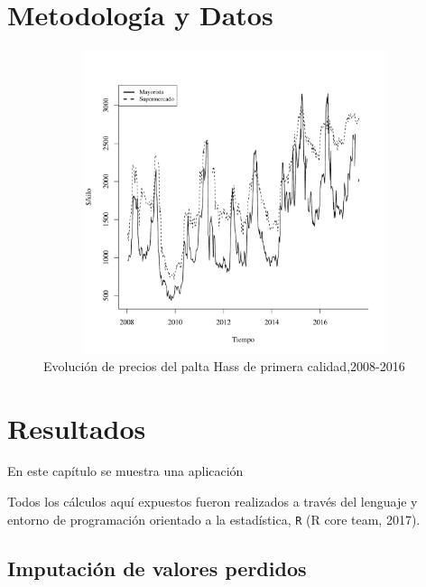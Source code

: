 \documentclass[12pt, twoside]{book}\usepackage[]{graphicx}\usepackage[]{color}
\newenvironment{knitrout}{}{} %
\numberwithin{equation}{section}
\numberwithin{theorem}{section}
\numberwithin{teorema}{section}
\numberwithin{defi}{section}
\numberwithin{prop}{section}
\numberwithin{defi}{section}
\theoremstyle{plain}
\begin{document}
\chapter{Metodología y Datos}






\begin{knitrout}
\color{fgcolor}\begin{figure}[H]

{\centering \includegraphics[width=6.5in,height=3.5in]{figure/fig-1-1} 

}

\caption[Evolución de precios del palta Hass de primera calidad,2008-2016]{Evolución de precios del palta Hass de primera calidad,2008-2016}\label{fig:fig-1}
\end{figure}


\end{knitrout}




\chapter{Resultados}

En este capítulo se muestra una aplicación

Todos los cálculos aquí expuestos fueron realizados a través del lenguaje y entorno de programación orientado a la estadística, \texttt{R} (R core team, 2017).

\section{Imputación de valores perdidos}
\end{document}
